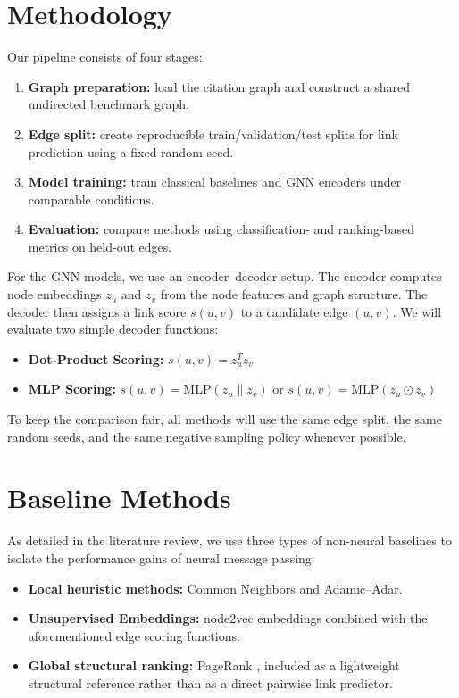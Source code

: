 \documentclass[11pt,a4paper]{article}
\begin{document}
\section{Methodology}

Our pipeline consists of four stages:
\begin{enumerate}
    \item \textbf{Graph preparation:} load the citation graph and construct a shared undirected benchmark graph.
    \item \textbf{Edge split:} create reproducible train/validation/test splits for link prediction using a fixed random seed.
    \item \textbf{Model training:} train classical baselines and GNN encoders under comparable conditions.
    \item \textbf{Evaluation:} compare methods using classification- and ranking-based metrics on held-out edges.
\end{enumerate}

For the GNN models, we use an encoder--decoder setup.
The encoder computes node embeddings $z_u$ and $z_v$ from the node features and graph structure.
The decoder then assigns a link score $s(u,v)$ to a candidate edge $(u,v)$. We will evaluate two simple decoder functions:
\begin{itemize}
    \item \textbf{Dot-Product Scoring:} $s(u,v) = z_u^T z_v$
    \item \textbf{MLP Scoring:} $s(u,v) = \mathrm{MLP}(z_u \parallel z_v)$ or $s(u,v) = \mathrm{MLP}(z_u \odot z_v)$
\end{itemize}

To keep the comparison fair, all methods will use the same edge split, the same random seeds,
and the same negative sampling policy whenever possible.

\section{Baseline Methods}

As detailed in the literature review, we use three types of non-neural baselines to isolate the performance gains of neural message passing:
\begin{itemize}
\item \textbf{Local heuristic methods:} Common Neighbors and Adamic--Adar.
\item \textbf{Unsupervised Embeddings:} node2vec \cite{grover2016node2vec} embeddings combined with the aforementioned edge scoring functions.
\item \textbf{Global structural ranking:} PageRank \cite{page1999pagerank}, included as a lightweight structural reference rather than as a direct pairwise link predictor.
\end{itemize}
\end{document}
